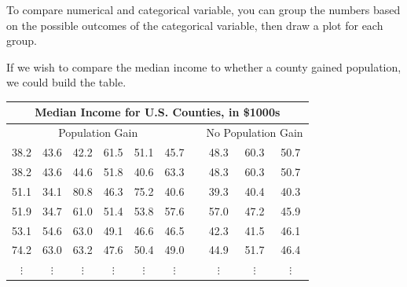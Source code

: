 \documentclass[handout]{beamer}
\begin{document}
\begin{frame}
\begin{note}
To compare numerical and categorical variable, you can group the numbers based on the possible outcomes of the categorical variable, then draw a plot for each group.
\end{note}\pause

\begin{example}
If we wish to compare the median income to whether a county gained population, we could build the table.

\vspace{-1mm}
\begin{center}
\begin{tabular}{cccccccccc}
\multicolumn{10}{c}{Median Income for U.S. Counties, in \$1000s}\\\hline
\multicolumn{6}{c}{Population Gain} && \multicolumn{3}{c}{No Population Gain}\\\cline{1-6}\cline{8-10}
38.2&43.6&42.2&61.5&51.1&45.7&&48.3&60.3&50.7\\
38.2&43.6&44.6&51.8&40.6&63.3&&48.3&60.3&50.7\\
51.1&34.1&80.8&46.3&75.2&40.6&&39.3&40.4&40.3\\
51.9&34.7&61.0&51.4&53.8&57.6&&57.0&47.2&45.9\\
53.1&54.6&63.0&49.1&46.6&46.5&&42.3&41.5&46.1\\
74.2&63.0&63.2&47.6&50.4&49.0&&44.9&51.7&46.4\\
$\vdots$&$\vdots$&$\vdots$&$\vdots$&$\vdots$&$\vdots$&&$\vdots$&$\vdots$&$\vdots$
\end{tabular}
\end{center}
\end{example}
\end{frame}
\end{document}
